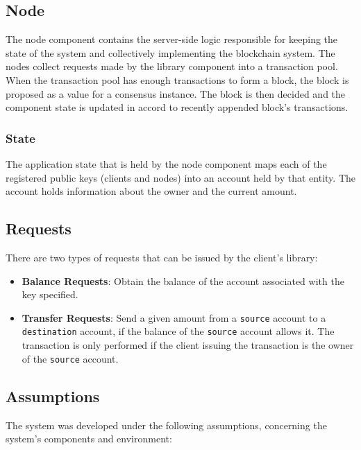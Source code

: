 \documentclass[letterpaper,twocolumn,10pt]{article}
\begin{document}
\subsection{Node}

The node component contains the server-side logic responsible for keeping the state of the system and collectively implementing the blockchain system. The nodes collect requests made by the library component into a transaction pool. When the transaction pool has enough transactions to form a block, the block is proposed as a value for a consensus instance. The block is then decided and the component state is updated in accord to recently appended block's transactions.

\subsubsection{State}

The application state that is held by the node component maps each of the registered public keys (clients and nodes) into an account held by that entity. The account holds information about the owner and the current amount.

\subsection{Requests}

There are two types of requests that can be issued by the client's library:

\begin{itemize}
    \item \textbf{Balance Requests}: Obtain the balance of the account associated with the key specified.
    \item \textbf{Transfer Requests}: Send a given amount from a \texttt{source} account to a \texttt{destination} account, if the balance of the \texttt{source} account allows it. The transaction is only performed if the client issuing the transaction is the owner of the \texttt{source} account.
\end{itemize}

\subsection{Assumptions}
\label{assumptions}

The system was developed under the following assumptions, concerning the system's components and environment:
\end{document}
